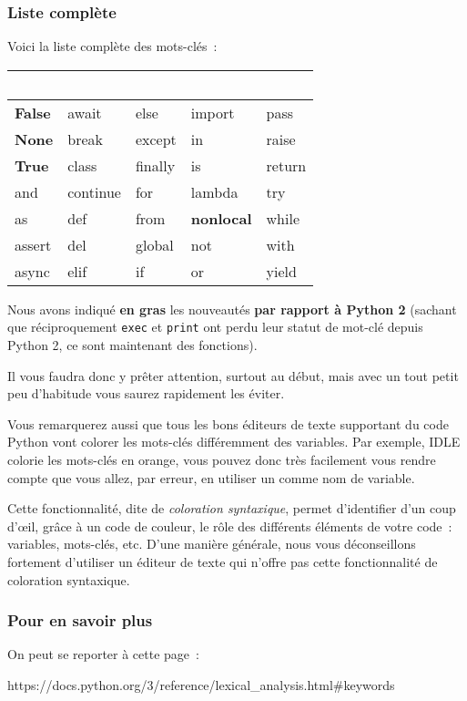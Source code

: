     \hypertarget{liste-compluxe8te}{%
\subsubsection{Liste complète}\label{liste-compluxe8te}}

    Voici la liste complète des mots-clés~:

    \begin{longtable}[]{@{}lllll@{}}
\toprule
~ & ~ & ~ & ~ & ~\tabularnewline
\midrule
\endhead
\textbf{False} & await & else & import & pass\tabularnewline
\textbf{None} & break & except & in & raise\tabularnewline
\textbf{True} & class & finally & is & return\tabularnewline
and & continue & for & lambda & try\tabularnewline
as & def & from & \textbf{nonlocal} & while\tabularnewline
assert & del & global & not & with\tabularnewline
async & elif & if & or & yield\tabularnewline
\bottomrule
\end{longtable}

    Nous avons indiqué \textbf{en gras} les nouveautés \textbf{par rapport à
Python 2} (sachant que réciproquement \texttt{exec} et \texttt{print}
ont perdu leur statut de mot-clé depuis Python 2, ce sont maintenant des
fonctions).

    Il vous faudra donc y prêter attention, surtout au début, mais avec un
tout petit peu d'habitude vous saurez rapidement les éviter.

Vous remarquerez aussi que tous les bons éditeurs de texte supportant du
code Python vont colorer les mots-clés différemment des variables. Par
exemple, IDLE colorie les mots-clés en orange, vous pouvez donc très
facilement vous rendre compte que vous allez, par erreur, en utiliser un
comme nom de variable.

Cette fonctionnalité, dite de \emph{coloration syntaxique}, permet
d'identifier d'un coup d'œil, grâce à un code de couleur, le rôle des
différents éléments de votre code~: variables, mots-clés, etc. D'une
manière générale, nous vous déconseillons fortement d'utiliser un
éditeur de texte qui n'offre pas cette fonctionnalité de coloration
syntaxique.

    \hypertarget{pour-en-savoir-plus}{%
\subsubsection{Pour en savoir plus}\label{pour-en-savoir-plus}}

    On peut se reporter à cette page~:

https://docs.python.org/3/reference/lexical\_analysis.html\#keywords


    
    
    
